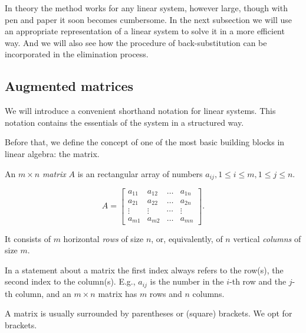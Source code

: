 In theory  the method works for any linear system, however large, though with pen and paper it soon becomes cumbersome.  In the next subsection we will use an appropriate representation of a linear system to solve it in a more efficient way.  And we will also see  how the procedure of back-substitution can be incorporated in the elimination process.

\subsection{Augmented matrices}
\label{Subsec:LinSystems:AugmentedMatrix}

We will introduce a convenient shorthand notation for  linear systems. This notation  contains the essentials of the system in a structured way.  

Before that, we define the concept of one of the most basic building blocks in linear algebra:  the matrix.

\begin{dfn}
\label{Dfn:LinSystems:Matrix}
An $m \times n$  \emph{matrix} $A$ is an rectangular array of numbers  $a_{ij}, 1\leq i \leq m, 1 \leq j \leq n$.

$$

   A = \left[
\begin{array}{cccc}
            a_{11} & a_{12}&  \ldots&   a_{1n}   \\
            a_{21} & a_{22}&  \ldots&   a_{2n}   \\
            \vdots &  \vdots&  \cdots&  \vdots    \\
            a_{m1} & a_{m2}&  \ldots&   a_{mn}    
          \end{array}
   \right].
$$

It consists of  $m$ horizontal  \emph{rows}  of size $n$, or, equivalently, of $n$ vertical \emph{columns} of size $m$.
\end{dfn}


In a statement about a matrix  the  first index always refers to the row(s), the second index to the column(s).
E.g., $a_{ij}$  is the number in the $i$-th row and the $j$-th column, and an $m \times n$ matrix has $m$ rows and $n$ columns.

A matrix is usually surrounded by parentheses or (square) brackets.  We opt for brackets.

